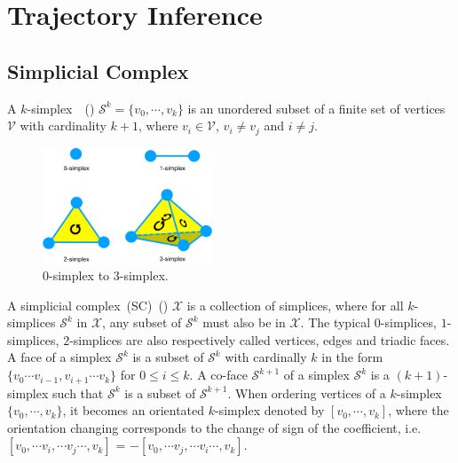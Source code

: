 \section{Trajectory Inference}
\label{TI_methods:TI}

\subsection{Simplicial Complex}



A $k$-simplex~\citep{schaub2021signal}~() $\mathcal{S}^k = \{{v}_0,\cdots,{v}_k \}$ is an unordered subset of a finite set of vertices $\mathcal{V}$ with cardinality $k + 1$, where $v_i\in \mathcal{V}$, $v_i \neq v_j$ and $i \neq j$. 

\begin{figure}[!h]
    \centering
    \includegraphics[width=0.45\textwidth]{Simplex/fig}
    \vspace{0.1cm}
    \caption[0-simplex to 3-simplex.]{0-simplex to 3-simplex.}
    \label{fig:simplex}
\end{figure}

A simplicial complex~(SC)~() $\mathcal{X}$ is a collection of simplices, where for all $k$-simplices $\mathcal{S}^k$ in $\mathcal{X}$, any subset of $\mathcal{S}^k$ must also be in $\mathcal{X}$. The typical $0$-simplices, $1$-simplices, $2$-simplices are also respectively called vertices, edges and triadic faces. A face of a simplex $\mathcal{S}^k$ is a subset of $\mathcal{S}^k$  with cardinally $k$ in the form $\{v_0 \cdots v_{i-1}, v_{i+1}\cdots v_k\}$ for $0 \leq i \leq k$. A co-face $\mathcal{S}^{k+1}$ of a simplex $\mathcal{S}^k$ is a $(k + 1)$-simplex such that $\mathcal{S}^k$ is a subset of $\mathcal{S}^{k+1}$.  When ordering vertices of a $k$-simplex $\{{v}_0,\cdots,{v}_k \}$, it becomes an orientated $k$-simplex denoted by $[{v}_0,\cdots,{v}_k ]$, where the orientation changing corresponds to the change of sign of the coefficient, i.e. $[{v}_0,\cdots {v}_i, \cdots {v}_j\cdots,{v}_k ]$ = $-[{v}_0,\cdots {v}_j, \cdots {v}_i\cdots,{v}_k ]$. 

